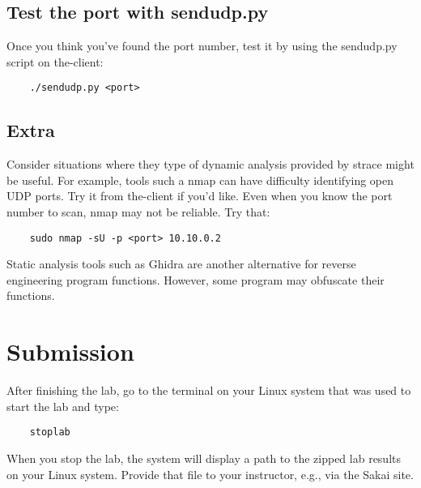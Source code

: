 \subsection{Test the port with sendudp.py}
Once you think you've found the port number, test it by using the sendudp.py script on the-client:
\begin{verbatim}
    ./sendudp.py <port>
\end{verbatim}

\subsection{Extra}
Consider situations where they type of dynamic analysis provided by strace might be useful.
For example, tools such a nmap can have difficulty identifying open UDP ports.  Try it from the-client if you'd like.
Even when you know the port number to scan, nmap may not be reliable.  Try that:
\begin{verbatim}
    sudo nmap -sU -p <port> 10.10.0.2
\end{verbatim}
Static analysis tools such as Ghidra are another alternative for reverse engineering program functions.  However, some program
may obfuscate their functions.

\section{Submission}
After finishing the lab, go to the terminal on your Linux system that was used to start the lab and type:
\begin{verbatim}
    stoplab 
\end{verbatim}
When you stop the lab, the system will display a path to the zipped lab results on your Linux system.  Provide that file to 
your instructor, e.g., via the Sakai site.

\copyrightnotice


